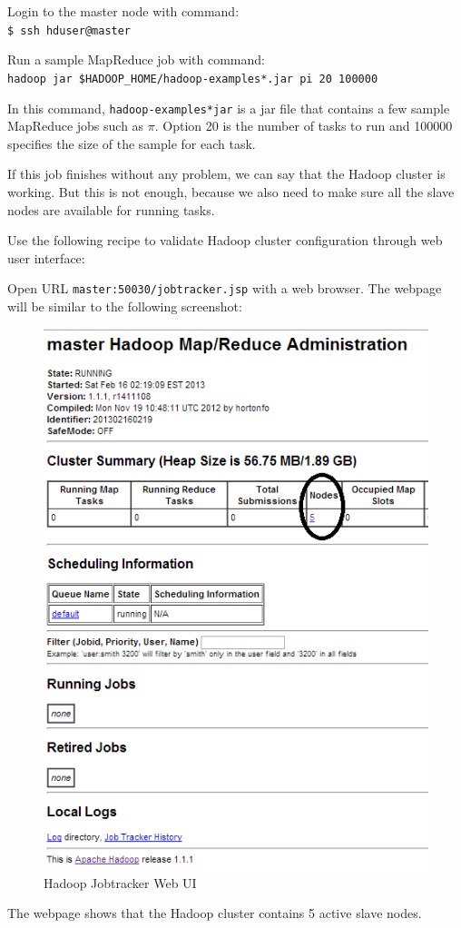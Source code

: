 Login to the master node with command: \\
\verb|$ ssh hduser@master|

Run a sample MapReduce job with command: \\
\verb|hadoop jar $HADOOP_HOME/hadoop-examples*.jar pi 20 100000|

In this command, \verb|hadoop-examples*jar| is a jar file that contains a few sample MapReduce jobs such as $\pi$. Option 20 is the number of tasks to run and 100000 specifies the size of the sample for each task.

If this job finishes without any problem, we can say that the Hadoop cluster is working. But this is not enough, because we also need to make sure all the slave nodes are available for running tasks.

Use the following recipe to validate Hadoop cluster configuration through web user interface:

Open URL \verb|master:50030/jobtracker.jsp| with a web browser.
The webpage will be similar to the following screenshot:

\begin{figure}[h]
  \centering
  \includegraphics[width=.6\textwidth]{figs/5163OS_03_02.png}
  \caption{Hadoop Jobtracker Web UI}\label{fig:jobtracker.webui}
\end{figure} 


The webpage shows that the Hadoop cluster contains 5 active slave nodes.

